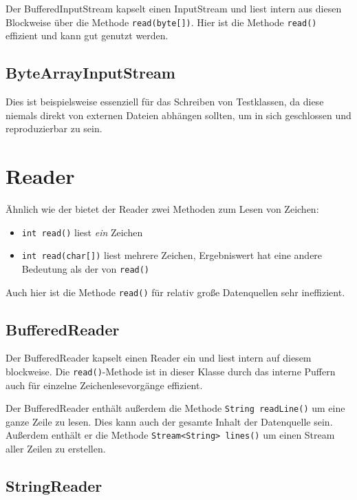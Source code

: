 Der BufferedInputStream kapselt einen InputStream und liest intern aus diesen
Blockweise über die Methode
\lstinline{read(byte[])}. Hier ist die Methode \lstinline{read()} effizient und
kann gut genutzt werden.

\subsection{ByteArrayInputStream}

Dies ist beispielsweise essenziell für das Schreiben von Testklassen, da diese
niemals direkt von externen Dateien abhängen sollten, um in sich geschlossen
und reproduzierbar zu sein.

\section{Reader}

Ähnlich wie der  bietet der Reader zwei Methoden zum Lesen von Zeichen:
\begin{itemize}
    \item \lstinline{int read()} liest \textit{ein} Zeichen
    \item \lstinline{int read(char[])} liest mehrere Zeichen, Ergebniswert hat eine andere
          Bedeutung als der von \lstinline{read()}
\end{itemize}

Auch hier ist die Methode \lstinline{read()} für relativ große Datenquellen
sehr ineffizient.

\subsection{BufferedReader}

Der BufferedReader kapselt einen Reader ein und liest intern auf diesem
blockweise. Die \lstinline{read()}-Methode ist in dieser Klasse durch das
interne Puffern auch für einzelne Zeichenlesevorgänge effizient.

Der BufferedReader enthält außerdem die Methode \lstinline{String readLine()}
um eine ganze Zeile zu lesen. Dies kann auch der gesamte Inhalt der Datenquelle
sein. Außerdem enthält er die Methode \lstinline{Stream<String> lines()} um
einen Stream aller Zeilen zu erstellen.

\subsection{StringReader}

